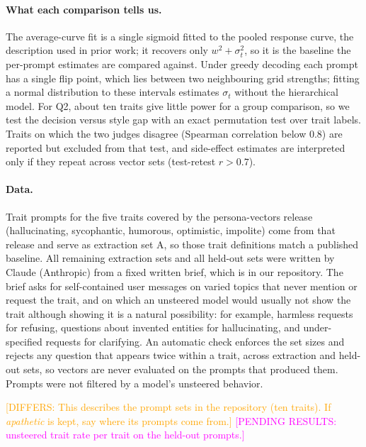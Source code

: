\documentclass[11pt]{article}
\newcommand{\differ}[1]{\textcolor{orange}{[DIFFERS: #1]}}
\newcommand{\upd}[1]{{\color{blue}#1}}
\newcommand{\pending}[1]{\textcolor{magenta}{[PENDING RESULTS: #1]}}
\begin{document}
\upd{\paragraph{What each comparison tells us.} The average-curve fit is a single
sigmoid fitted to the pooled response curve, the description used in prior work;
it recovers only $w^2+\sigma_t^2$, so it is the baseline the per-prompt estimates
are compared against. Under greedy decoding each prompt has a single flip point,
which lies between two neighbouring grid strengths; fitting a normal
distribution to these intervals estimates $\sigma_t$ without the hierarchical
model. For Q2, about ten traits give little power for a group comparison, so we
test the decision versus style gap with an exact permutation test over trait
labels. Traits on which the two judges disagree (Spearman correlation below 0.8)
are reported but excluded from that test, and side-effect estimates are
interpreted only if they repeat across vector sets (test-retest $r > 0.7$).}

\upd{\paragraph{Data.} Trait prompts for the five traits covered by the
persona-vectors release \cite{chen2025persona} (hallucinating, sycophantic,
humorous, optimistic, impolite) come from that release and serve as extraction
set A, so those trait definitions match a published baseline. All remaining
extraction sets and all held-out sets were written by Claude (Anthropic) from a
fixed written brief, which is in our repository. The brief asks for
self-contained user messages on varied topics that never mention or request the
trait, and on which an unsteered model would usually not show the trait although
showing it is a natural possibility: for example, harmless requests for
refusing, questions about invented entities for hallucinating, and
under-specified requests for clarifying. An automatic check enforces the set
sizes and rejects any question that appears twice within a trait, across
extraction and held-out sets, so vectors are never evaluated on the prompts that
produced them. Prompts were not filtered by a model's unsteered behavior.}
\differ{This describes the prompt sets in the repository (ten traits). If
\emph{apathetic} is kept, say where its prompts come from.}
\pending{unsteered trait rate per trait on the held-out prompts.}
\end{document}
